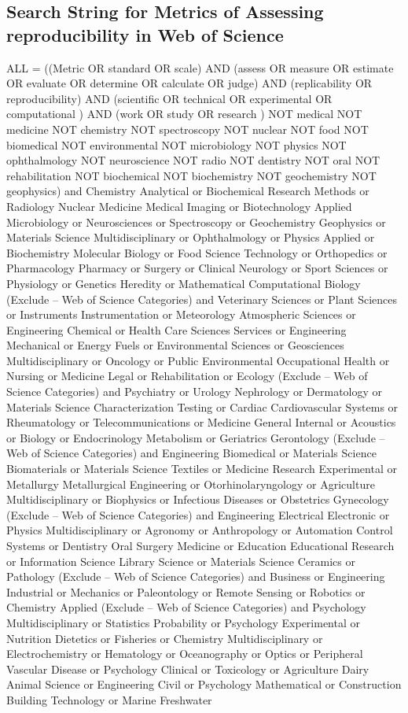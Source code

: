 \documentclass[
10pt, %
a4paper, %
oneside, %
headinclude,footinclude, %
BCOR5mm, %
]{scrartcl}
\begin{document}
\subsection{Search String for Metrics of Assessing reproducibility in Web of Science}
ALL = ((Metric OR standard OR scale) AND (assess OR measure OR estimate OR evaluate OR determine OR calculate OR judge) AND (replicability OR reproducibility) AND (scientific OR technical OR experimental OR computational ) AND (work OR study OR research ) NOT medical NOT medicine NOT chemistry NOT spectroscopy NOT nuclear NOT food NOT biomedical NOT environmental NOT microbiology NOT physics NOT ophthalmology NOT neuroscience NOT radio NOT dentistry NOT oral NOT rehabilitation NOT biochemical NOT biochemistry NOT geochemistry NOT geophysics) and Chemistry Analytical or Biochemical Research Methods or Radiology Nuclear Medicine Medical Imaging or Biotechnology Applied Microbiology or Neurosciences or Spectroscopy or Geochemistry Geophysics or Materials Science Multidisciplinary or Ophthalmology or Physics Applied or Biochemistry Molecular Biology or Food Science Technology or Orthopedics or Pharmacology Pharmacy or Surgery or Clinical Neurology or Sport Sciences or Physiology or Genetics Heredity or Mathematical Computational Biology (Exclude – Web of Science Categories) and Veterinary Sciences or Plant Sciences or Instruments Instrumentation or Meteorology Atmospheric Sciences or Engineering Chemical or Health Care Sciences Services or Engineering Mechanical or Energy Fuels or Environmental Sciences or Geosciences Multidisciplinary or Oncology or Public Environmental Occupational Health or Nursing or Medicine Legal or Rehabilitation or Ecology (Exclude – Web of Science Categories) and Psychiatry or Urology Nephrology or Dermatology or Materials Science Characterization Testing or Cardiac Cardiovascular Systems or Rheumatology or Telecommunications or Medicine General Internal or Acoustics or Biology or Endocrinology Metabolism or Geriatrics Gerontology (Exclude – Web of Science Categories) and Engineering Biomedical or Materials Science Biomaterials or Materials Science Textiles or Medicine Research Experimental or Metallurgy Metallurgical Engineering or Otorhinolaryngology or Agriculture Multidisciplinary or Biophysics or Infectious Diseases or Obstetrics Gynecology (Exclude – Web of Science Categories) and Engineering Electrical Electronic or Physics Multidisciplinary or Agronomy or Anthropology or Automation Control Systems or Dentistry Oral Surgery Medicine or Education Educational Research or Information Science Library Science or Materials Science Ceramics or Pathology (Exclude – Web of Science Categories) and Business or Engineering Industrial or Mechanics or Paleontology or Remote Sensing or Robotics or Chemistry Applied (Exclude – Web of Science Categories) and Psychology Multidisciplinary or Statistics Probability or Psychology Experimental or Nutrition Dietetics or Fisheries or Chemistry Multidisciplinary or Electrochemistry or Hematology or Oceanography or Optics or Peripheral Vascular Disease or Psychology Clinical or Toxicology or Agriculture Dairy Animal Science or Engineering Civil or Psychology Mathematical or Construction Building Technology or Marine Freshwater 
\end{document}
